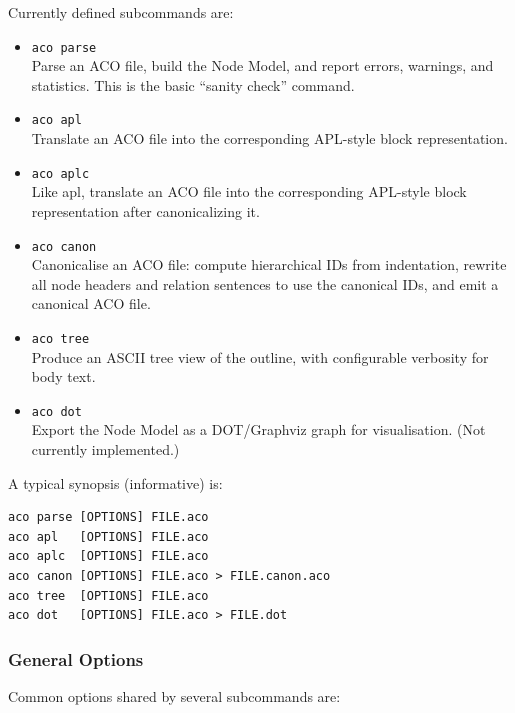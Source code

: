\documentclass[11pt,twoside,a4paper]{article}
\begin{document}
Currently defined subcommands are:

\begin{itemize}[leftmargin=2em]
  \item \texttt{aco parse} \\
        Parse an ACO file, build the Node Model, and report errors, warnings, and statistics. This is the basic ``sanity check'' command.
  \item \texttt{aco apl} \\
        Translate an ACO file into the corresponding APL-style block representation.
  \item \texttt{aco aplc} \\
        Like apl, translate an ACO file into the corresponding APL-style block representation after canonicalizing it.
  \item \texttt{aco canon} \\
        Canonicalise an ACO file: compute hierarchical IDs from indentation, rewrite all node headers and relation sentences to use the canonical IDs, and emit a canonical ACO file.
  \item \texttt{aco tree} \\
        Produce an ASCII tree view of the outline, with configurable verbosity for body text.
  \item \texttt{aco dot} \\
        Export the Node Model as a DOT/Graphviz graph for visualisation. (Not currently implemented.)
\end{itemize}

A typical synopsis (informative) is:

\begin{verbatim}
aco parse [OPTIONS] FILE.aco
aco apl   [OPTIONS] FILE.aco
aco aplc  [OPTIONS] FILE.aco
aco canon [OPTIONS] FILE.aco > FILE.canon.aco
aco tree  [OPTIONS] FILE.aco
aco dot   [OPTIONS] FILE.aco > FILE.dot
\end{verbatim}

\subsubsection*{General Options}

Common options shared by several subcommands are:
\end{document}
